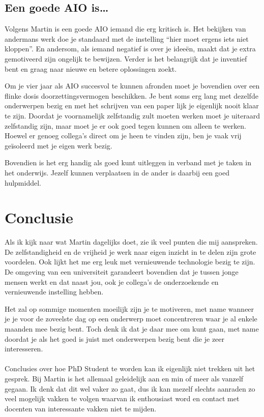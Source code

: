 \documentclass[a4paper,11pt]{article} %
\begin{document}
\subsection*{Een goede AIO is\ldots}

Volgens Martin is een goede AIO iemand die erg kritisch is. Het bekijken van
andermans werk doe je standaard met de instelling ``hier moet ergens iets niet
kloppen''. En andersom, als iemand negatief is over je idee\"en, maakt dat je
extra gemotiveerd zijn ongelijk te bewijzen. Verder is het belangrijk dat je
inventief bent en graag naar nieuwe en betere oplossingen zoekt.

Om je vier jaar als AIO succesvol te kunnen afronden moet je bovendien over
een flinke dosis doorzettingsvermogen beschikken. Je bent soms erg lang met
dezelfde onderwerpen bezig en met het schrijven van een paper lijk je
eigenlijk nooit klaar te zijn. Doordat je voornamelijk zelfstandig zult moeten
werken moet je uiteraard zelfstandig zijn, maar moet je er ook goed tegen
kunnen om alleen te werken. Hoewel er genoeg collega's direct om je heen te
vinden zijn, ben je vaak vrij ge\"isoleerd met je eigen werk bezig.

Bovendien is het erg handig als goed kunt uitleggen in verband met je taken in
het onderwijs. Jezelf kunnen verplaatsen in de ander is daarbij een goed
hulpmiddel.


\section*{Conclusie}

Als ik kijk naar wat Martin dagelijks doet, zie ik veel punten die mij
aanspreken. De zelfstandigheid en de vrijheid je werk naar eigen inzicht in te
delen zijn grote voordelen. Ook lijkt het me erg leuk met vernieuwende
technologie bezig te zijn. De omgeving van een universiteit garandeert
bovendien dat je tussen jonge mensen werkt en dat naast jou, ook je collega's
de onderzoekende en vernieuwende instelling hebben.

Het zal op sommige momenten moeilijk zijn je te motiveren, met name wanneer je
je voor de zoveelste dag op een onderwerp moet concentreren waar je al enkele
maanden mee bezig bent. Toch denk ik dat je daar mee om kunt gaan, met name
doordat je als het goed is juist met onderwerpen bezig bent die je zeer
interesseren.

\paragraph{}

Conclusies over hoe PhD Student te worden kan ik eigenlijk niet trekken uit
het gesprek. Bij Martin is het allemaal geleidelijk aan en min of meer als
vanzelf gegaan. Ik denk dat dit wel vaker zo gaat, dus ik kan mezelf slechts
aanraden zo veel mogelijk vakken te volgen waarvan ik enthousiast word en
contact met docenten van interessante vakken niet te mijden.
\end{document}
